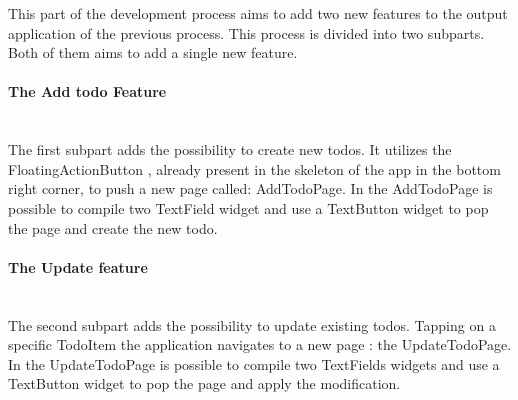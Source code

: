 

This part of the development process aims to add two new features to the output application of the previous process. This process is divided into two subparts. Both of them aims to add a single new feature.

\paragraph{The Add todo Feature} \mbox{} \\
\label{par:add_todo_feature_explanation}
The first subpart adds the possibility to create new todos. It utilizes the FloatingActionButton , already present in the skeleton of the app in the bottom right corner, to push a new page called: AddTodoPage. In the AddTodoPage is possible to compile two TextField widget and use a TextButton widget to pop the page and create the new todo.
 
 
\paragraph{The Update feature} \mbox{} \\
\label{par:update_todo_feature_explanation}
The second subpart adds the possibility to update existing todos. Tapping on a specific TodoItem the application navigates to a new page : the UpdateTodoPage. In the UpdateTodoPage is possible to compile two TextFields widgets and use a TextButton widget to pop the page and apply the modification.